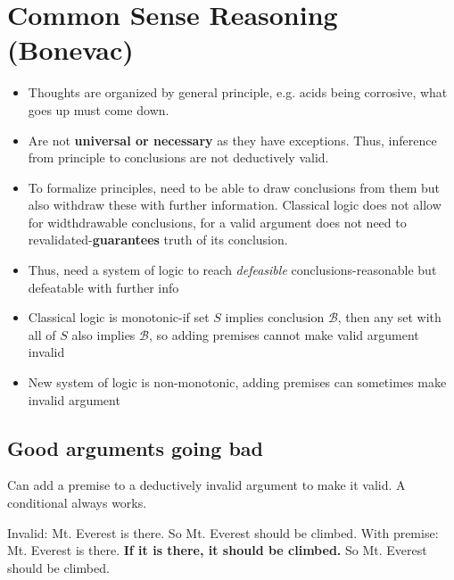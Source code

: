 \section{Common Sense Reasoning (Bonevac)}

\begin{itemize}
    \item Thoughts are organized by general principle, 
    e.g. acids being corrosive, what goes up must come down.
    \item Are not \textbf{universal or necessary} as they have exceptions.
    Thus, inference from principle to conclusions are not deductively valid.
    \item To formalize principles, need to be able to draw conclusions from them but also withdraw these
    with further information. Classical logic does not allow for widthdrawable conclusions, for a valid argument does not need to
    revalidated-\textbf{guarantees} truth of its conclusion.
    \item Thus, need a system of logic to reach \textit{defeasible} conclusions-reasonable but defeatable with further info
    \item Classical logic is monotonic-if set $S$ implies conclusion $\mathcal{B}$, then any set with all of $S$ also implies $\mathcal{B}$, so adding premises cannot make valid argument invalid
    \item New system of logic is non-monotonic, adding premises can sometimes make invalid argument
\end{itemize}

\subsection{Good arguments going bad}

Can add a premise to a deductively invalid argument to make it valid. A conditional always works.

\begin{example}
    Invalid: Mt. Everest is there. So Mt. Everest should be climbed.\newline
    With premise: Mt. Everest is there. \textbf{If it is there, it should be climbed.} So Mt. Everest should be climbed.
\end{example}

